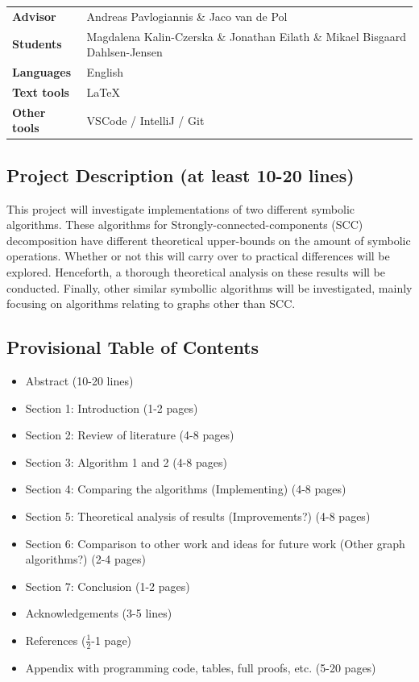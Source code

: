 \documentclass{article}
\begin{document}
\pagestyle{fancy}

\bgroup{}
\begin{table}[h]
\begin{tabular}{ll}
\textbf{Advisor}     & Andreas Pavlogiannis \& Jaco van de Pol               \\
\textbf{Students}    & Magdalena Kalin-Czerska \& Jonathan Eilath \& Mikael Bisgaard Dahlsen-Jensen   \\
\textbf{Languages}   & English \\
\textbf{Text tools}  & \LaTeX       \\
\textbf{Other tools} & VSCode / IntelliJ  / Git       
\end{tabular}
\end{table}
\egroup\vspace{-0.cm}

\subsection*{Project Description (at least 10-20 lines)}

This project will investigate implementations of two different symbolic algorithms. These algorithms for Strongly-connected-components (SCC) decomposition have different theoretical upper-bounds on the amount of symbolic operations. Whether or not this will carry over to practical differences will be explored. Henceforth, a thorough theoretical analysis on these results will be conducted. Finally, other similar symbollic algorithms will be investigated, mainly focusing on algorithms relating to graphs other than SCC.\\[2mm]





\subsection*{Provisional Table of Contents}
\begin{itemize}
    \item Abstract (10-20 lines)
    \item Section 1: Introduction (1-2 pages)
    \item Section 2: Review of literature (4-8 pages)
    \item Section 3: Algorithm 1 and 2 (4-8 pages)
    \item Section 4: Comparing the algorithms (Implementing) (4-8 pages)
    \item Section 5: Theoretical analysis of results (Improvements?) (4-8 pages)
    \item Section 6: Comparison to other work and ideas for future work (Other graph algorithms?) (2-4 pages)
    \item Section 7: Conclusion (1-2 pages)
    \item Acknowledgements (3-5 lines)
    \item References ($\frac{1}{2}$-1 page)
    \item Appendix with programming code, tables, full proofs, etc. (5-20 pages)
\end{itemize}
\end{document}
